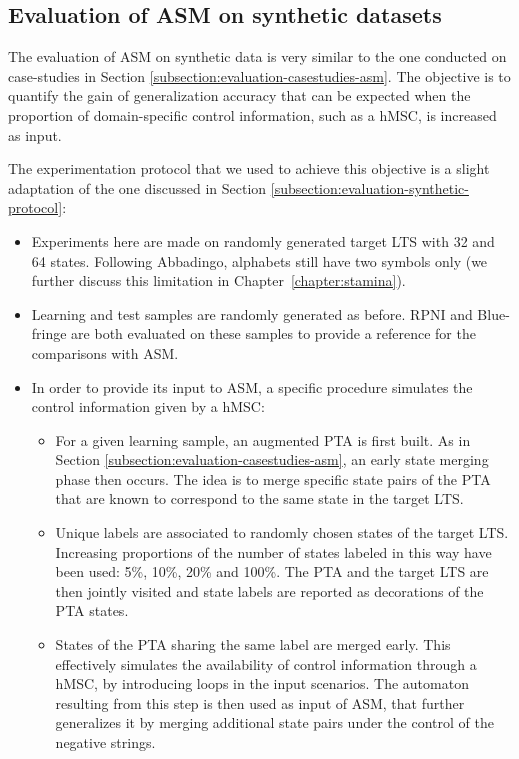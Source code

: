\subsection{Evaluation of ASM on synthetic datasets\label{subsection:evaluation-synthetic-asm}}

The evaluation of ASM on synthetic data is very similar to the one conducted on case-studies in Section \ref{subsection:evaluation-casestudies-asm}. The objective is to quantify the gain of generalization accuracy that can be expected when the proportion of domain-specific control information, such as a hMSC, is increased as input. 

The experimentation protocol that we used to achieve this objective is a slight adaptation of the one discussed in Section \ref{subsection:evaluation-synthetic-protocol}:
\begin{itemize}
\item Experiments here are made on randomly generated target LTS with 32 and 64 states. Following Abbadingo, alphabets still have two symbols only (we further discuss this limitation in Chapter~\ref{chapter:stamina}).
\item Learning and test samples are randomly generated as before. RPNI and Blue-fringe are both evaluated on these samples to provide a reference for the comparisons with ASM.  
\item In order to provide its input to ASM, a specific procedure simulates the control information given by a hMSC:
\begin{itemize}
\item For a given learning sample, an augmented PTA is first built. As in Section \ref{subsection:evaluation-casestudies-asm}, an early state merging phase then occurs. The idea is to merge specific state pairs of the PTA that are known to correspond to the same state in the target LTS.
\item Unique labels are associated to randomly chosen states of the target LTS. Increasing proportions of the number of states labeled in this way have been used: 5\%, 10\%, 20\% and 100\%. The PTA and the target LTS are then jointly visited and state labels are reported as decorations of the PTA states. 
\item States of the PTA sharing the same label are merged early. This effectively simulates the availability of control information through a hMSC, by introducing loops in the input scenarios. The automaton resulting from this step is then used as input of ASM, that further generalizes it by merging additional state pairs under the control of the negative strings.
\end{itemize}
\end{itemize}
 
